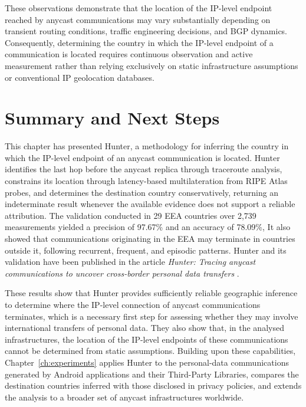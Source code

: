 These observations demonstrate that the location of the IP-level endpoint reached by anycast communications may vary substantially depending on transient routing conditions, traffic engineering decisions, and BGP dynamics. Consequently, determining the country in which the IP-level endpoint of a communication is located requires continuous observation and active measurement rather than relying exclusively on static infrastructure assumptions or conventional IP geolocation databases.

\section{Summary and Next Steps}
\label{sc:hunter_summary}

This chapter has presented Hunter, a methodology for inferring the country in which the IP-level endpoint of an anycast communication is located. Hunter identifies the last hop before the anycast replica through traceroute analysis, constrains its location through latency-based multilateration from RIPE Atlas probes, and determines the destination country conservatively, returning an indeterminate result whenever the available evidence does not support a reliable attribution. The validation conducted in 29 EEA countries over 2,739 measurements yielded a precision of 97.67\% and an accuracy of 78.09\%, It also showed that communications originating in the EEA may terminate in countries outside it, following recurrent, frequent, and episodic patterns. Hunter and its validation have been published in the article \emph{Hunter: Tracing anycast communications to uncover cross-border personal data transfers} \cite{Pascual2024Hunter:Transfers}.

These results show that Hunter provides sufficiently reliable geographic inference to determine where the IP-level connection of anycast communications terminates, which is a necessary first step for assessing whether they may involve international transfers of personal data. They also show that, in the analysed infrastructures, the location of the IP-level endpoints of these communications cannot be determined from static assumptions. Building upon these capabilities, Chapter~\ref{ch:experiments} applies Hunter to the personal-data communications generated by Android applications and their Third-Party Libraries, compares the destination countries inferred with those disclosed in privacy policies, and extends the analysis to a broader set of anycast infrastructures worldwide.
